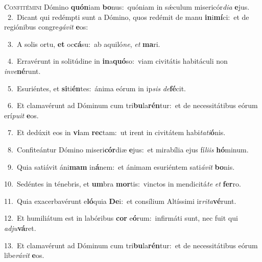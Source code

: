 \lettrine{\initial\textcolor{\initialcolor}{C}}{onfitémini} Dómino \textbf{quón}\-iam \textbf{bo}\-nus:~\star quóniam in sǽculum misericór\-\textit{di}\-\textit{a} \textbf{e}\-jus.\\
{\numbfont\textcolor{\numbcolor}{~2.}}~Dicant qui redémpti sunt a Dómino, quos redémit de manu \textbf{in}\-i\-\textbf{mí}\-ci:~\star et de regiónibus congre\-\textit{gá}\-\textit{vit} \textbf{e}\-os:\par
{\numbfont\textcolor{\numbcolor}{~3.}}~A solis ortu, \textbf{et} oc\-\textbf{cá}\-su:~\star ab aquiló\-\textit{ne}\-, \textit{et} \textbf{ma}\-ri.\par
{\numbfont\textcolor{\numbcolor}{~4.}}~Erravérunt in solitúdine in \textbf{in}\-a\-\textbf{quó}\-so:~\star viam civitátis habitáculi non \textit{in}\-\textit{ve}\textbf{né}runt.\par
{\numbfont\textcolor{\numbcolor}{~5.}}~Esuriéntes, et \textbf{si}\-ti\-\textbf{én}\-tes:~\star ánima eórum in ip\textit{sis} \textit{de}\-\textbf{fé}cit.\par
{\numbfont\textcolor{\numbcolor}{~6.}}~Et clamavérunt ad Dóminum cum tri\-\textbf{bu}\-la\-\textbf{rén}\-tur:~\star et de necessitátibus eórum erí\-\textit{pu}\-\textit{it} \textbf{e}\-os.\par
{\numbfont\textcolor{\numbcolor}{~7.}}~Et dedúxit eos in \textbf{vi}\-am \textbf{rec}\-tam:~\star ut irent in civitátem habi\-\textit{ta}\-\textit{ti}\textbf{ó}nis.\par
{\numbfont\textcolor{\numbcolor}{~8.}}~Confiteántur Dómino miseri\-\textbf{cór}\-diæ \textbf{e}\-jus:~\star et mirabília ejus fí\-\textit{li}\-\textit{is} \textbf{hó}\-minum.\par
{\numbfont\textcolor{\numbcolor}{~9.}}~Quia satiávit áni\textbf{mam} in\-\textbf{á}\-nem:~\star et ánimam esuriéntem sati\-\textit{á}\-\textit{vit} \textbf{bo}\-nis.\par
{\numbfont\textcolor{\numbcolor}{10.}}~Sedéntes in ténebris, et \textbf{um}\-bra \textbf{mor}\-tis:~\star vinctos in mendicitá\textit{te} \textit{et} \textbf{fer}\-ro.\par
{\numbfont\textcolor{\numbcolor}{11.}}~Quia exacerbavérunt e\-\textbf{ló}\-quia \textbf{De}\-i:~\star et consílium Altíssimi ir\-\textit{ri}\-\textit{ta}\textbf{vé}runt.\par
{\numbfont\textcolor{\numbcolor}{12.}}~Et humiliátum est in labóribus \textbf{cor} e\-\textbf{ó}\-rum:~\star infirmáti sunt, nec fuit qui \textit{ad}\-\textit{ju}\textbf{vá}ret.\par
{\numbfont\textcolor{\numbcolor}{13.}}~Et clamavérunt ad Dóminum cum tri\-\textbf{bu}\-la\-\textbf{rén}\-tur:~\star et de necessitátibus eórum libe\-\textit{rá}\-\textit{vit} \textbf{e}\-os.\par
